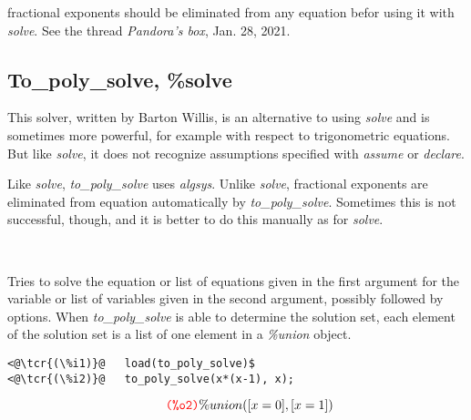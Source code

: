 \documentclass[../Maxima_Workbook.tex]{subfiles}
\begin{document}
\lz fractional exponents should be eliminated from any equation befor using it with \emph{solve}. See the thread \emph{Pandora's box}, Jan. 28, 2021.


\subsection{To\_poly\_solve, \%solve}

This solver, written by Barton Willis, is an alternative to using \emph{solve} and is sometimes more powerful, for example with respect to trigonometric equations. But like \emph{solve}, it does not recognize assumptions specified with \emph{assume} or \emph{declare}.

\lz Like \emph{solve}, \emph{to\_poly\_solve} uses \emph{algsys}. Unlike \emph{solve}, fractional exponents are eliminated from equation automatically by \emph{to\_poly\_solve}. Sometimes this is not successful, though, and it is better to do this manually as for \emph{solve}.

\begin{small}
\lzz {}

\hfill {} \\
\hfill {}
\end{small}

\lzz Tries to solve the equation or list of equations given in the first argument for the variable or list of variables given in the second argument, possibly followed by options. When \emph{to\_poly\_solve} is able to determine the solution set, each element of the solution set is a list of one element in a \emph{\%union} object.

\lz \begin{small}
\color{blue} \leqn
\begin{lstlisting}
<@\tcr{(\%i1)}@   load(to_poly_solve)$
<@\tcr{(\%i2)}@   to_poly_solve(x*(x-1), x);
\end{lstlisting}
\vspace{-5mm} \[\tag*{\tcr{\ttfamily (\%o2)}} \%union([x = 0], [x = 1]) \]
\color{black} \reqn
\end{small}
\vspace{-4mm} 
\end{document}
